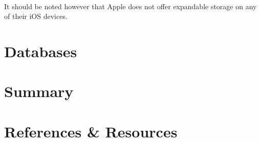 \paragraph{} It should be noted however that Apple does not offer expandable storage on any of their iOS devices.


\section{Databases}
\paragraph{}

\section{Summary}
\paragraph{}

\section{References \& Resources}
\paragraph{}

